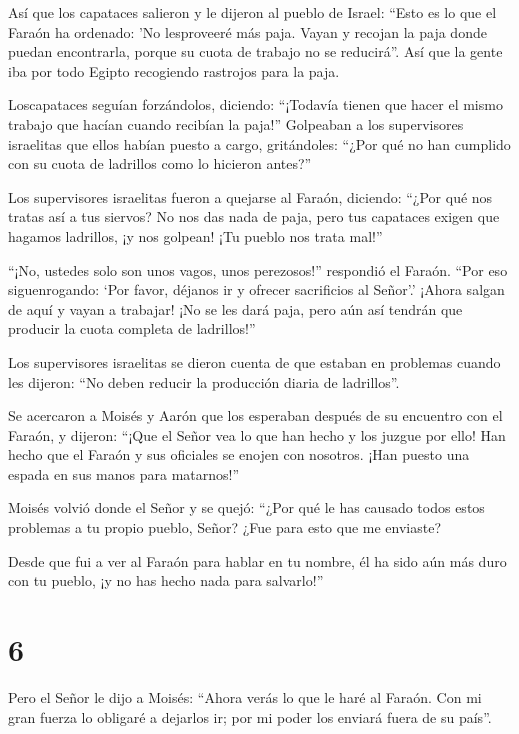  Así que los capataces salieron y le dijeron al pueblo de
Israel: ``Esto es lo que el Faraón ha ordenado: 'No lesproveeré más
paja.  Vayan y recojan la paja donde puedan encontrarla,
porque su cuota de trabajo no se reducirá''.  Así que la
gente iba por todo Egipto recogiendo rastrojos para la paja.

 Loscapataces seguían forzándolos, diciendo: ``¡Todavía
tienen que hacer el mismo trabajo que hacían cuando recibían la paja!''
 Golpeaban a los supervisores israelitas que ellos habían
puesto a cargo, gritándoles: ``¿Por qué no han cumplido con su cuota de
ladrillos como lo hicieron antes?''

 Los supervisores israelitas fueron a quejarse al Faraón,
diciendo: ``¿Por qué nos tratas así a tus siervos?  No nos
das nada de paja, pero tus capataces exigen que hagamos ladrillos, ¡y
nos golpean! ¡Tu pueblo nos trata mal!''

 ``¡No, ustedes solo son unos vagos, unos perezosos!''
respondió el Faraón. ``Por eso siguenrogando: `Por favor, déjanos ir y
ofrecer sacrificios al Señor'.'  ¡Ahora salgan de aquí y
vayan a trabajar! ¡No se les dará paja, pero aún así tendrán que
producir la cuota completa de ladrillos!''

 Los supervisores israelitas se dieron cuenta de que
estaban en problemas cuando les dijeron: ``No deben reducir la
producción diaria de ladrillos''.

 Se acercaron a Moisés y Aarón que los esperaban después de
su encuentro con el Faraón,  y dijeron: ``¡Que el Señor vea
lo que han hecho y los juzgue por ello! Han hecho que el Faraón y sus
oficiales se enojen con nosotros. ¡Han puesto una espada en sus manos
para matarnos!''

 Moisés volvió donde el Señor y se quejó: ``¿Por qué le has
causado todos estos problemas a tu propio pueblo, Señor? ¿Fue para esto
que me enviaste?

 Desde que fui a ver al Faraón para hablar en tu nombre, él
ha sido aún más duro con tu pueblo, ¡y no has hecho nada para
salvarlo!''

\hypertarget{section-5}{%
\section{6}\label{section-5}}

 Pero el Señor le dijo a Moisés: ``Ahora verás lo que le
haré al Faraón. Con mi gran fuerza lo obligaré a dejarlos ir; por mi
poder los enviará fuera de su país''.

